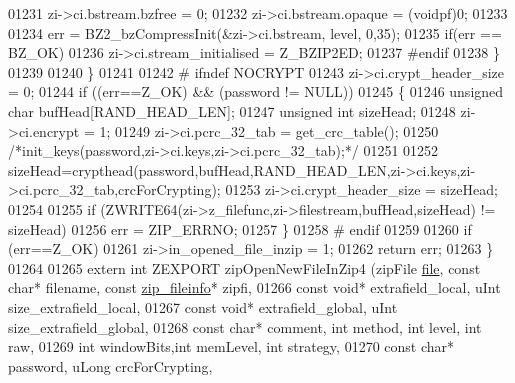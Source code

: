 \begin{DoxyCode}
01231           zi->ci.bstream.bzfree = 0;
01232           zi->ci.bstream.opaque = (voidpf)0;
01233 
01234           err = BZ2\_bzCompressInit(&zi->ci.bstream, level, 0,35);
01235           \textcolor{keywordflow}{if}(err == BZ\_OK)
01236             zi->ci.stream\_initialised = Z\_BZIP2ED;
01237 \textcolor{preprocessor}{#endif}
01238         \}
01239 
01240     \}
01241 
01242 \textcolor{preprocessor}{#    ifndef NOCRYPT}
01243     zi->ci.crypt\_header\_size = 0;
01244     \textcolor{keywordflow}{if} ((err==Z\_OK) && (password != NULL))
01245     \{
01246         \textcolor{keywordtype}{unsigned} \textcolor{keywordtype}{char} bufHead[RAND\_HEAD\_LEN];
01247         \textcolor{keywordtype}{unsigned} \textcolor{keywordtype}{int} sizeHead;
01248         zi->ci.encrypt = 1;
01249         zi->ci.pcrc\_32\_tab = get\_crc\_table();
01250         \textcolor{comment}{/*init\_keys(password,zi->ci.keys,zi->ci.pcrc\_32\_tab);*/}
01251 
01252         sizeHead=crypthead(password,bufHead,RAND\_HEAD\_LEN,zi->ci.keys,zi->ci.pcrc\_32\_tab,crcForCrypting);
01253         zi->ci.crypt\_header\_size = sizeHead;
01254 
01255         \textcolor{keywordflow}{if} (ZWRITE64(zi->z\_filefunc,zi->filestream,bufHead,sizeHead) != sizeHead)
01256                 err = ZIP\_ERRNO;
01257     \}
01258 \textcolor{preprocessor}{#    endif}
01259 
01260     \textcolor{keywordflow}{if} (err==Z\_OK)
01261         zi->in\_opened\_file\_inzip = 1;
01262     \textcolor{keywordflow}{return} err;
01263 \}
01264 
01265 \textcolor{keyword}{extern} \textcolor{keywordtype}{int} ZEXPORT zipOpenNewFileInZip4 (zipFile \hyperlink{structfile}{file}, \textcolor{keyword}{const} \textcolor{keywordtype}{char}* filename, \textcolor{keyword}{const} 
      \hyperlink{structzip__fileinfo}{zip\_fileinfo}* zipfi,
01266                                          \textcolor{keyword}{const} \textcolor{keywordtype}{void}* extrafield\_local, uInt size\_extrafield\_local,
01267                                          \textcolor{keyword}{const} \textcolor{keywordtype}{void}* extrafield\_global, uInt size\_extrafield\_global,
01268                                          \textcolor{keyword}{const} \textcolor{keywordtype}{char}* comment, \textcolor{keywordtype}{int} method, \textcolor{keywordtype}{int} level, \textcolor{keywordtype}{int} raw,
01269                                          \textcolor{keywordtype}{int} windowBits,\textcolor{keywordtype}{int} memLevel, \textcolor{keywordtype}{int} strategy,
01270                                          \textcolor{keyword}{const} \textcolor{keywordtype}{char}* password, uLong crcForCrypting,

\end{DoxyCode}
